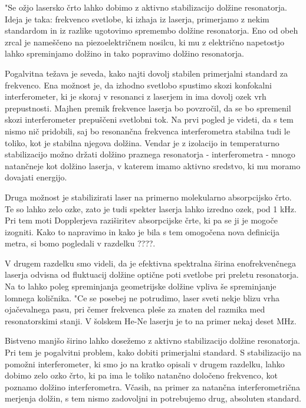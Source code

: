 "Se ožjo lasersko črto lahko dobimo z aktivno stabilizacijo dolžine
resonatorja. Ideja je taka: frekvenco svetlobe, ki izhaja iz laserja,
primerjamo z nekim standardom in iz razlike ugotovimo spremembo dolžine
resonatorja. Eno od obeh zrcal je nameščeno na piezoelektričnem nosilcu,
ki mu z električno napetostjo lahko spreminjamo dolžino in tako popravimo
dolžino resonatorja.

Pogalvitna težava je seveda, kako najti dovolj stabilen primerjalni
standard za frekvenco. Ena možnost je, da izhodno svetlobo spustimo skozi
konfokalni interferometer, ki je skoraj v resonanci z laserjem in ima dovolj
ozek vrh prepustnosti. Majhen premik frekvence laserja bo povzročil, da se
bo spremenil skozi interferometer prepuščeni svetlobni tok. Na prvi pogled
je videti, da s tem nismo nič pridobili, saj bo resonančna frekvenca
interferometra stabilna tudi le toliko, kot je stabilna njegova dolžina.
Vendar je z izolacijo in temperaturno stabilizacijo možno držati dolžino
praznega resonatorja - interferometra - mnogo natančneje kot dolžino
laserja, v katerem imamo aktivno sredstvo, ki mu moramo dovajati energijo.

Druga možnost je stabilizirati laser na primerno molekularno absorpcijsko
črto. Te so lahko zelo ozke, zato je tudi spekter laserja lahko izredno
ozek, pod 1 kHz. Pri tem moti Dopplerjeva raziširitev absorpcijske črte,
ki pa se ji je mogoče izogniti. Kako to napravimo in kako je bila s tem
omogočena nova definicija metra, si bomo pogledali v razdelku ????.


V drugem razdelku smo videli, da je efektivna spektralna širina
eno\-frekvenčnega laserja odvisna od fluktuacij dolžine optične poti
svetlobe pri preletu resonatorja. Na to lahko poleg spreminjanja
geometrijske dolžine vpliva še spreminjanje lomnega količnika. "Ce se
posebej ne potrudimo, laser sveti nekje blizu vrha ojačevalnega pasu, pri
čemer frekvenca pleše za znaten del razmika med resonatorskimi stanji. V
šolskem He-Ne laserju je to na primer nekaj deset MHz.

Bistveno manjšo širino lahko dosežemo z aktivno stabilizacijo dolžine
resonatorja. Pri tem je pogalvitni problem, kako dobiti primerjalni
standard. S stabilizacijo na pomožni interferometer, ki smo jo na kratko
opisali v drugem razdelku, lahko dobimo zelo ozko črto, ki pa ima le toliko
natančno določeno frekvenco, kot poznamo dolžino interferometra. Včasih,
na primer za natančna interferometrična merjenja dolžin, s tem nismo
zadovoljni in potrebujemo drug, absoluten standard.

